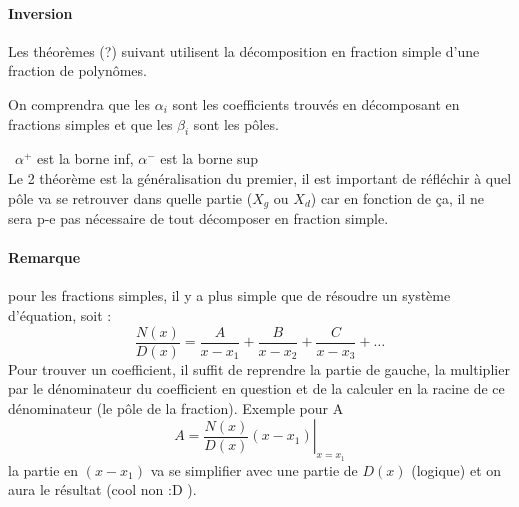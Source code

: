 \paragraph{Inversion}
Les théorèmes (?) suivant utilisent la décomposition en fraction simple d'une fraction de polynômes.
\begin{center}
      \end{center}
On comprendra que les $\alpha_i$ sont les coefficients trouvés en décomposant en fractions simples et que les $\beta_i$ sont les pôles.
\begin{center}
      \end{center}
\danger\ $\alpha^+$ est la borne inf, $\alpha^-$ est la borne sup\\
Le 2 théorème est la généralisation du premier, il est important de réfléchir à quel pôle va se retrouver dans quelle partie ($X_g$ ou $X_d$) car en fonction de ça, il ne sera p-e pas nécessaire de tout décomposer en fraction simple.
\paragraph{Remarque} pour les fractions simples, il y a plus simple que de résoudre un système d'équation, soit : $$\frac{N(x)}{D(x)}=\frac{A}{x-x_1}+\frac{B}{x-x_2}+\frac{C}{x-x_3}+\dots$$ Pour trouver un coefficient, il suffit de reprendre la partie de gauche, la multiplier par le dénominateur du coefficient en question et de la calculer en la racine de ce dénominateur (le pôle de la fraction). Exemple pour A $$A=\left.\frac{N(x)}{D(x)}(x-x_1)\right|_{x=x_1}$$
la partie en $(x-x_1)$ va se simplifier avec une partie de $D(x)$ (logique) et on aura le résultat (cool non :D ).
